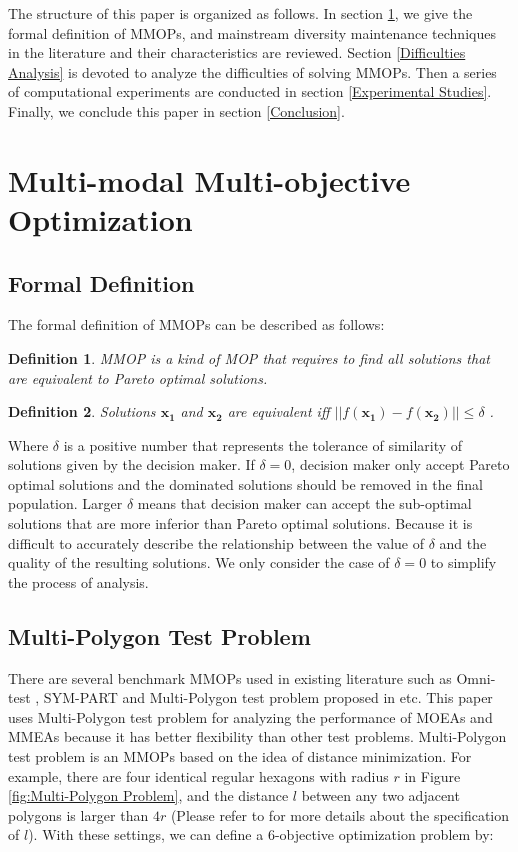 \documentclass[conference]{IEEEtran}
\newtheorem{definition}{Definition}
\begin{document}
The structure of this paper is organized as follows. In section \ref{Multi-modal Multi-objective Optimization}, we give the formal definition of MMOPs, and mainstream diversity maintenance techniques in the literature and their characteristics are reviewed. Section \ref{Difficulties Analysis} is devoted to analyze the difficulties of solving MMOPs. Then a series of computational experiments are conducted in section \ref{Experimental Studies}. Finally, we conclude this paper in section \ref{Conclusion}.
\section{Multi-modal Multi-objective Optimization}
\label{Multi-modal Multi-objective Optimization}
\subsection{Formal Definition}
The formal definition of MMOPs can be described as follows\cite{Tanabe2019}:
\begin{definition}
MMOP is a kind of MOP that requires to find all solutions that are equivalent to Pareto optimal solutions. 
\end{definition}
\begin{definition}
Solutions $\boldsymbol{x_1}$ and  $\boldsymbol{x_2}$ are equivalent  iff $||f(\boldsymbol{x_1}) - f(\boldsymbol{x_2})|| \leq \delta$ .
\end{definition}
Where $\delta$ is a positive number that represents the tolerance of similarity of solutions given by the decision maker. If $\delta = 0$, decision maker only accept Pareto optimal solutions and the dominated solutions should be removed in the final population.  Larger $\delta$ means that decision maker can accept the sub-optimal solutions that are more inferior than Pareto optimal solutions. Because it is difficult to accurately describe the relationship between the value of $\delta$ and the quality of the resulting solutions. We only consider the case of $\delta =0$ to simplify the process of analysis. 

\subsection{Multi-Polygon Test Problem}
There are several benchmark MMOPs used in existing literature such as Omni-test \cite{Deb2005} , SYM-PART \cite{Rudolph2007a} and Multi-Polygon test problem proposed in \cite{Hisao} etc. This paper uses Multi-Polygon test problem for analyzing the performance of MOEAs and MMEAs because it has better flexibility than other test problems.  Multi-Polygon test problem is an MMOPs based on the idea of distance minimization. For example, there are four identical regular hexagons with radius $r$ in Figure \ref{fig:Multi-Polygon Problem}, and the distance $l$ between any two adjacent polygons is larger than $4r$ (Please refer to \cite{Hisao} for more details about the specification of $l$). With these settings, we can define a 6-objective optimization problem by:
\end{document}
